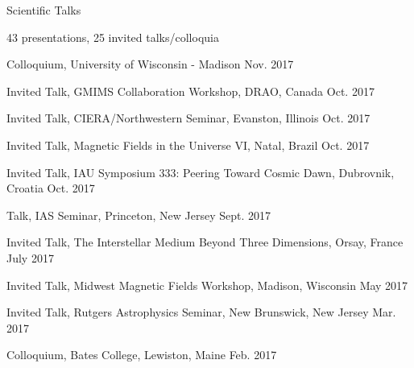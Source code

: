\documentclass{resume_clark} %
\begin{document}
\begin{rSection}{Scientific Talks}

43 presentations, 25 invited talks/colloquia 

\begin{etaremune}[itemsep=-1.8mm]



\item Colloquium, University of Wisconsin - Madison \hfill{Nov. 2017}

\item Invited Talk, GMIMS Collaboration Workshop, DRAO, Canada \hfill{Oct. 2017}

\item Invited Talk, CIERA/Northwestern Seminar, Evanston, Illinois \hfill{Oct. 2017}

\item Invited Talk, Magnetic Fields in the Universe VI, Natal, Brazil \hfill{Oct. 2017}

\item Invited Talk, IAU Symposium 333: Peering Toward Cosmic Dawn, Dubrovnik, Croatia \hfill{Oct. 2017}

\item Talk, IAS Seminar, Princeton, New Jersey \hfill{Sept. 2017}

\item Invited Talk, The Interstellar Medium Beyond Three Dimensions, Orsay, France \hfill{July 2017}

\item Invited Talk, Midwest Magnetic Fields Workshop, Madison, Wisconsin \hfill{May 2017}

\item Invited Talk, Rutgers Astrophysics Seminar, New Brunswick, New Jersey \hfill{Mar. 2017}

\item Colloquium, Bates College, Lewiston, Maine \hfill{Feb. 2017}


\end{etaremune}
\end{rSection}
\end{document}
